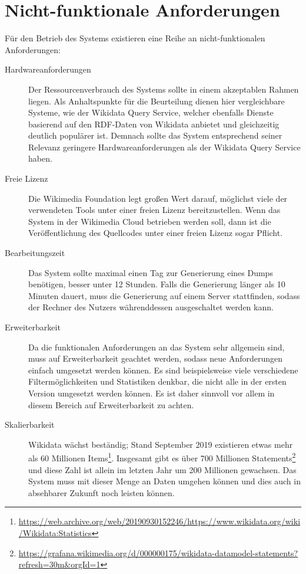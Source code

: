 \section{Nicht-funktionale Anforderungen}
Für den Betrieb des Systems existieren eine Reihe an nicht-funktionalen Anforderungen:

\begin{description}
  \item[Hardwareanforderungen] Der Ressourcenverbrauch des Systems sollte in einem akzeptablen Rahmen liegen.
  Als Anhaltspunkte für die Beurteilung dienen hier vergleichbare Systeme, wie der Wikidata Query Service, welcher ebenfalls Dienste basierend auf den RDF-Daten von Wikidata anbietet und gleichzeitig deutlich populärer ist. Demnach sollte das System entsprechend seiner Relevanz geringere Hardwareanforderungen als der Wikidata Query Service haben.
\item[Freie Lizenz] Die Wikimedia Foundation legt großen Wert darauf, möglichst viele der verwendeten Tools unter einer freien Lizenz bereitzustellen\cite{wikimedia-guiding-principles}.
  Wenn das System in der Wikimedia Cloud betrieben werden soll, dann ist die Veröffentlichung des Quellcodes unter einer freien Lizenz sogar Pflicht\cite{wikimedia-cloud-tos}.
\item[Bearbeitungszeit] Das System sollte maximal einen Tag zur Generierung eines Dumps benötigen, besser unter 12 Stunden. Falls die Generierung länger als 10 Minuten dauert, muss die Generierung auf einem Server stattfinden, sodass der Rechner des Nutzers währenddessen ausgeschaltet werden kann.
\item[Erweiterbarkeit] Da die funktionalen Anforderungen an das System sehr allgemein sind, muss auf Erweiterbarkeit geachtet werden, sodass neue Anforderungen einfach umgesetzt werden können. Es sind beispielsweise viele verschiedene Filtermöglichkeiten und Statistiken denkbar, die nicht alle in der ersten Version umgesetzt werden können. Es ist daher sinnvoll vor allem in diesem Bereich auf Erweiterbarkeit zu achten.
\item[Skalierbarkeit] Wikidata wächst beständig; Stand September 2019 existieren etwas mehr als 60 Millionen Items\footnote{\url{https://web.archive.org/web/20190930152246/https://www.wikidata.org/wiki/Wikidata:Statistics}}.
  Insgesamt gibt es über 700 Millionen Statements\footnote{\url{https://grafana.wikimedia.org/d/000000175/wikidata-datamodel-statements?refresh=30m&orgId=1}} und diese Zahl ist allein im letzten Jahr um 200 Millionen gewachsen. Das System muss mit dieser Menge an Daten umgehen können und dies auch in absehbarer Zukunft noch leisten können.
\end{description}

